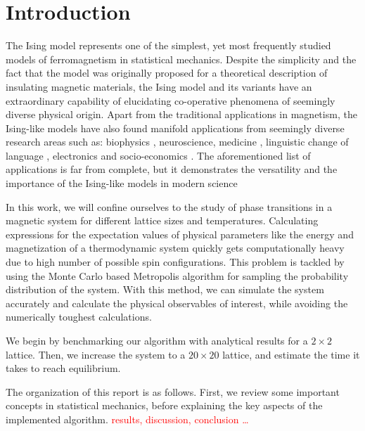 \documentclass[../main.tex]{subfiles}
\begin{document}
\section{Introduction}\label{sec:introduction}
The Ising model \cite{Ising1925} represents one of the simplest, yet most frequently studied models of ferromagnetism in statistical mechanics. Despite the simplicity and the fact that the model was originally proposed for a theoretical description of insulating magnetic materials, the Ising model and its variants have an extraordinary capability of elucidating co-operative phenomena of seemingly diverse physical origin. Apart from the traditional applications in magnetism, the Ising-like models have also found manifold  applications from seemingly diverse research areas \cite{StreckaJozef2015Abao} such as: biophysics \cite{MONOD196588, Thompson1968}, neuroscience, medicine \cite{TorquatoSalvatore2011TaIm}, linguistic change of language \cite{Stauffer2008}, electronics and socio-economics \cite{Stauffer2008}. The aforementioned list of applications is far from complete, but it demonstrates the versatility and the importance of the Ising-like models in modern science 

In this work, we will confine ourselves to the study of phase transitions in a magnetic system for different lattice sizes and temperatures. Calculating expressions for the expectation values of physical parameters like the energy and magnetization of a thermodynamic system quickly gets computationally heavy due to high number of possible spin configurations. This problem is tackled by using the Monte Carlo based Metropolis algorithm for sampling the probability distribution of the system. With this method, we can simulate the system accurately and calculate the physical observables of interest, while avoiding the numerically toughest calculations. 

We begin by benchmarking our algorithm with analytical results for a \ensuremath{2\times2} lattice. Then, we increase the system to a \ensuremath{20\times20} lattice, and estimate the time it takes to reach equilibrium. 

The organization of this report is as follows. First, we review some important concepts in statistical mechanics, before explaining the key aspects of the implemented algorithm. \textcolor{red}{results, discussion, conclusion \ldots}
\end{document}

